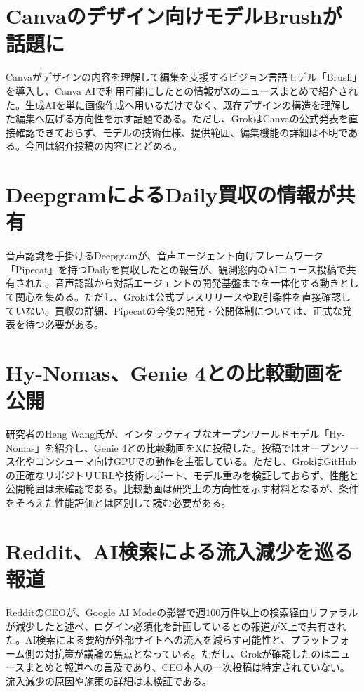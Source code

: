 \section{Canvaのデザイン向けモデルBrushが話題に}
Canvaがデザインの内容を理解して編集を支援するビジョン言語モデル「Brush」を導入し、Canva AIで利用可能にしたとの情報がXのニュースまとめで紹介された。生成AIを単に画像作成へ用いるだけでなく、既存デザインの構造を理解した編集へ広げる方向性を示す話題である。ただし、GrokはCanvaの公式発表を直接確認できておらず、モデルの技術仕様、提供範囲、編集機能の詳細は不明である。今回は紹介投稿の内容にとどめる。

\section{DeepgramによるDaily買収の情報が共有}
音声認識を手掛けるDeepgramが、音声エージェント向けフレームワーク「Pipecat」を持つDailyを買収したとの報告が、観測窓内のAIニュース投稿で共有された。音声認識から対話エージェントの開発基盤までを一体化する動きとして関心を集める。ただし、Grokは公式プレスリリースや取引条件を直接確認していない。買収の詳細、Pipecatの今後の開発・公開体制については、正式な発表を待つ必要がある。

\section{Hy-Nomas、Genie 4との比較動画を公開}
研究者のHeng Wang氏が、インタラクティブなオープンワールドモデル「Hy-Nomas」を紹介し、Genie 4との比較動画をXに投稿した。投稿ではオープンソース化やコンシューマ向けGPUでの動作を主張している。ただし、GrokはGitHubの正確なリポジトリURLや技術レポート、モデル重みを検証しておらず、性能と公開範囲は未確認である。比較動画は研究上の方向性を示す材料となるが、条件をそろえた性能評価とは区別して読む必要がある。

\section{Reddit、AI検索による流入減少を巡る報道}
RedditのCEOが、Google AI Modeの影響で週100万件以上の検索経由リファラルが減少したと述べ、ログイン必須化を計画しているとの報道がX上で共有された。AI検索による要約が外部サイトへの流入を減らす可能性と、プラットフォーム側の対抗策が議論の焦点となっている。ただし、Grokが確認したのはニュースまとめと報道への言及であり、CEO本人の一次投稿は特定されていない。流入減少の原因や施策の詳細は未検証である。
